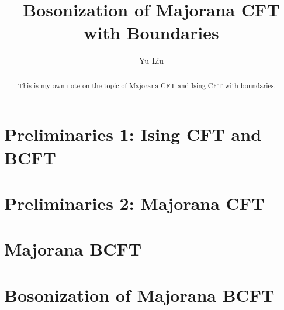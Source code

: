 \documentclass[11pt]{article}
\begin{document}
\title{\boldmath Bosonization of Majorana CFT with Boundaries}
\author{Yu Liu}

\maketitle

\begin{abstract}
  This is my own note on the topic of Majorana CFT and Ising CFT with
  boundaries.

\end{abstract}

\tableofcontents

\newpage
\section{Preliminaries 1: Ising CFT and BCFT}\label{sec:Boundary
Ising CFT} %


\section{Preliminaries 2: Majorana CFT}\label{sec:Majorana CFT} %



\newpage
\section{Majorana BCFT}\label{sec:Free Majorana Fermion BCFT} %


\newpage
\section{Bosonization of Majorana BCFT}\label{sec:Bosonization of
Majorana BCFT} %


% 

\newpage

\end{document}
